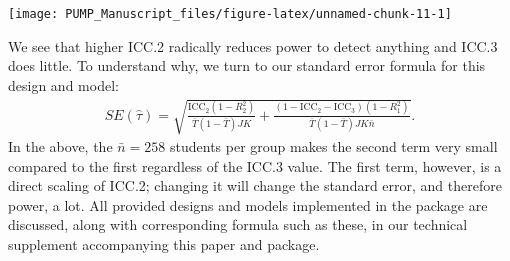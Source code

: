 \documentclass[
]{article}
\newenvironment{Shaded}{\begin{snugshade}}{\end{snugshade}}
\newcommand{\AttributeTok}[1]{\textcolor[rgb]{0.77,0.63,0.00}{#1}}
\newcommand{\DecValTok}[1]{\textcolor[rgb]{0.00,0.00,0.81}{#1}}
\newcommand{\FloatTok}[1]{\textcolor[rgb]{0.00,0.00,0.81}{#1}}
\newcommand{\FunctionTok}[1]{\textcolor[rgb]{0.00,0.00,0.00}{#1}}
\newcommand{\NormalTok}[1]{#1}
\newcommand{\OtherTok}[1]{\textcolor[rgb]{0.56,0.35,0.01}{#1}}
\newcommand{\SpecialCharTok}[1]{\textcolor[rgb]{0.00,0.00,0.00}{#1}}
\newcommand{\StringTok}[1]{\textcolor[rgb]{0.31,0.60,0.02}{#1}}
\begin{document}
\begin{Shaded}
\end{Shaded}

\begin{center}\texttt{[image: PUMP\_Manuscript\_files/figure-latex/unnamed-chunk-11-1]} \end{center}

We see that higher ICC.2 radically reduces power to detect anything and
ICC.3 does little. To understand why, we turn to our standard error
formula for this design and model: \[
\begin{aligned}
SE( \hat{\tau} ) = \sqrt{
\frac{\text{ICC}_{2}(1 - R^2_{2})}{\bar{T}(1 - \bar{T}) JK} +
\frac{(1-\text{ICC}_{2} - \text{ICC}_{3})(1-R^2_{1})}{\bar{T}(1 - \bar{T}) J K\bar{n}} } .
\end{aligned}
\] In the above, the \(\bar{n} = 258\) students per group makes the
second term very small compared to the first regardless of the ICC.3
value. The first term, however, is a direct scaling of ICC.2; changing
it will change the standard error, and therefore power, a lot. All
provided designs and models implemented in the package are discussed,
along with corresponding formula such as these, in our technical
supplement accompanying this paper and package.
\end{document}
